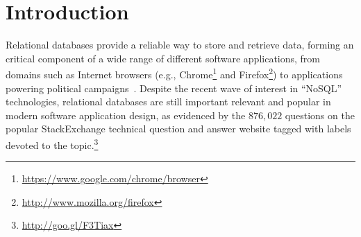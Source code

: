 
\section{Introduction}
\label{sec:introduction}










\begin{sloppypar}
  Relational databases provide a reliable way to store and retrieve data, forming an critical component of a wide range of different software applications, from domains such as Internet browsers (e.g., Chrome\footnote{\small{\url{https://www.google.com/chrome/browser}}} and Firefox\footnote{\small{\url{http://www.mozilla.org/firefox}}}) to applications powering political campaigns~\cite{Butler2012}. Despite the recent wave of interest in ``NoSQL'' technologies, relational databases are still important relevant and popular in modern software application design, as evidenced by the $876,022$ questions on the popular StackExchange technical question and answer website tagged with labels devoted to the topic.\footnote{\small{\url{http://goo.gl/F3Tiax}}} %
\end{sloppypar}

